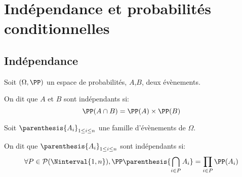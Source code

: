 \section{Indépendance et probabilités conditionnelles}
  \subsection{Indépendance}
    \begin{definition}
      Soit $(\Omega, \PP)$ un espace de probabilités, $A$,$B$, deux évènements.

      On dit que $A$ et $B$ sont indépendants si: \[
        \PP(A\cap B) = \PP(A)\times\PP(B)
      \]
    \end{definition}

    \begin{definition}
      Soit $\parenthesis{A_i}_{1\leq i \leq n}$ une famille d'évènements de
      $\Omega$.

      On dit que $\parenthesis{A_i}_{1\leq i \leq n}$ sont indépendants si: \[
        \forall P \in \mathcal{P}(\Ninterval{1,n}), \PP\parenthesis{\bigcap_{i\in P}A_i} = \prod_{i\in P}\PP(A_i)
      \]

    \end{definition}
